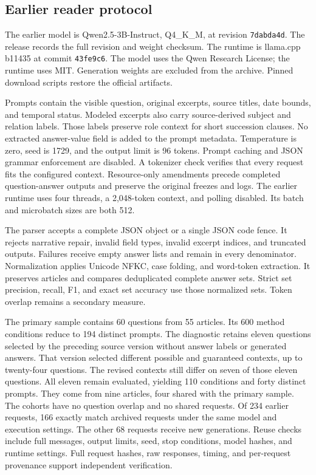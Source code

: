 \subsection{Earlier reader protocol}
\label{app:reader-legacy}
The earlier model is Qwen2.5-3B-Instruct, Q4\_K\_M, at revision \texttt{7dabda4d}.
The release records the full revision and weight checksum.
The runtime is llama.cpp b11435 at commit \texttt{43fe9c6}.
The model uses the Qwen Research License; the runtime uses MIT.
Generation weights are excluded from the archive.
Pinned download scripts restore the official artifacts.

Prompts contain the visible question, original excerpts, source titles, date bounds, and temporal status.
Modeled excerpts also carry source-derived subject and relation labels.
Those labels preserve role context for short succession clauses.
No extracted answer-value field is added to the prompt metadata.
Temperature is zero, seed is 1729, and the output limit is 96 tokens.
Prompt caching and JSON grammar enforcement are disabled.
A tokenizer check verifies that every request fits the configured context.
Resource-only amendments precede completed question-answer outputs and preserve the original freezes and logs.
The earlier runtime uses four threads, a 2,048-token context, and polling disabled.
Its batch and microbatch sizes are both 512.

The parser accepts a complete JSON object or a single JSON code fence.
It rejects narrative repair, invalid field types, invalid excerpt indices, and truncated outputs.
Failures receive empty answer lists and remain in every denominator.
Normalization applies Unicode NFKC, case folding, and word-token extraction.
It preserves articles and compares deduplicated complete answer sets.
Strict set precision, recall, F1, and exact set accuracy use those normalized sets.
Token overlap remains a secondary measure.

The primary sample contains 60 questions from 55 articles.
Its 600 method conditions reduce to 194 distinct prompts.
The diagnostic retains eleven questions selected by the preceding source version without answer labels or generated answers.
That version selected different possible and guaranteed contexts, up to twenty-four questions.
The revised contexts still differ on seven of those eleven questions.
All eleven remain evaluated, yielding 110 conditions and forty distinct prompts.
They come from nine articles, four shared with the primary sample.
The cohorts have no question overlap and no shared requests.
Of 234 earlier requests, 166 exactly match archived requests under the same model and execution settings.
The other 68 requests receive new generations.
Reuse checks include full messages, output limits, seed, stop conditions, model hashes, and runtime settings.
Full request hashes, raw responses, timing, and per-request provenance support independent verification.


